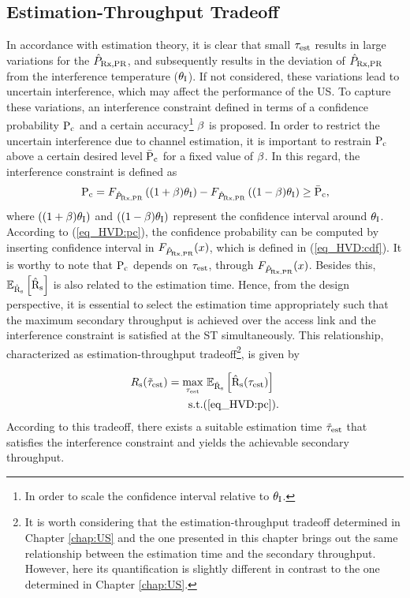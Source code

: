 \subsection{Estimation-Throughput Tradeoff}
In accordance with estimation theory, it is clear that small $\tau_{\text{est}}$ results in large variations for the $\hat{P}_{\text{Rx,PR}}$, and subsequently results in the deviation of $\hat{P}_{\text{Rx,PR}}$ from the interference temperature ($\theta_{\text{I}}$). If not considered, these variations lead to uncertain interference, which may affect the performance of the US. To capture these variations, an interference constraint defined in terms of a confidence probability $\text{P}_{\text{c}}$ and a certain accuracy\footnote{In order to scale the confidence interval relative to $\theta_{\text{I}}$.} $\beta$ is proposed. In order to restrict the uncertain interference due to channel estimation, it is important to restrain $\text{P}_{\text{c}}$ above a certain desired level $\bar{\text{P}}_{\text{c}}$ for a fixed value of $\beta$. In this regard, the interference constraint is defined as
\begin{align}
\text{P}_{\text{c}} = F_{\hat{P}_{\text{Rx,PR}}} \left( {(1 + \beta) \theta_{\text{I}}}\right)  - F_{\hat{P}_{\text{Rx,PR}}} \left({(1 - \beta) \theta_{\text{I}}} \right) \ge \bar{\text{P}}_{\text{c}}, \label{eq_HVD:pc} 
\end{align}
where $\left( {(1 + \beta) \theta_{\text{I}}}\right)$ and $\left({(1 - \beta) \theta_{\text{I}}} \right)$ represent the confidence interval around $\theta_{\text{I}}$. According to (\ref{eq_HVD:pc}), the confidence probability can be computed by inserting confidence interval in $F_{\hat{P}_{\text{Rx,PR}}}(x)$, which is defined in (\ref{eq_HVD:cdf}). It is worthy to note that $\text{P}_{\text{c}}$ depends on $\tau_{\text{est}}$, through $F_{\hat{P}_{\text{Rx,PR}}}(x)$. Besides this, ${\mathbb E}_{\hat{\text{{R}}}_{\text{s}}}\left[ \hat{\text{{R}}}_{\text{s}} \right]$ is also related to the estimation time. Hence, from the design perspective, it is essential to select the estimation time appropriately such that the maximum secondary throughput is achieved over the access link and the interference constraint is satisfied at the ST simultaneously. This relationship, characterized as estimation-throughput tradeoff\footnote{It is worth considering that the estimation-throughput tradeoff determined in Chapter \ref{chap:US} and the one presented in this chapter brings out the same relationship between the estimation time and the secondary throughput. However, here its quantification is slightly different in contrast to the one determined in Chapter \ref{chap:US}.}, is given by 


\begin{align}
R_{\text{s}}(\tilde{\tau}_{\text{est}}) = \operatorname*{max}_{\tau_{\text{est}}}  & \text{      } {\mathbb E}_{\hat{\text{{R}}}_{\text{s}}}\left[ \hat{\text{{R}}}_{\text{s}}(\tau_{\text{est}}) \right] 
 \label{eq_HVD:sys} \\
\text{s.t.} & (\ref{eq_HVD:pc}). \nonumber  
\end{align}
According to this tradeoff, there exists a suitable estimation time $\tilde{\tau}_{\text{est}}$ that satisfies the interference constraint and yields the achievable secondary throughput. 


